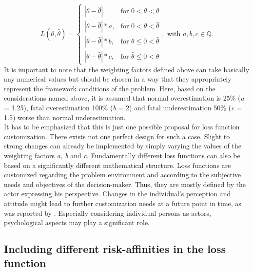 		\begin{equation}\label{eq:LF_final}
		L(\theta,\hat{\theta}) =
		\begin{cases}
		|\theta - \hat{\theta}|, & \text{for } 0<\hat{\theta}<\theta  \\
		|\theta-\hat{\theta}|*a, & \text{for } 0<\theta<\hat{\theta} \\
		|\theta-\hat{\theta}|*b, & \text{for } \theta\leq0<\hat{\theta} \\
		|\theta-\hat{\theta}|*c, & \text{for } \hat{\theta}\leq0<\theta 
		\end{cases},
		\text{ with } a,b,c \in \mathbb{Q}.
		\end{equation}  
		It is important to note that the weighting factors defined above can take basically any numerical values but should be chosen in a way that they appropriately represent the framework conditions of the problem. Here, based on the considerations named above, it is assumed that normal overestimation is 25\% (\textit{a} = 1.25), fatal overestimation 100\% (\textit{b} = 2) and fatal underestimation 50\% (\textit{c} = 1.5) worse than normal underestimation. \\		
		It has to be emphasized that this is just one possible proposal for loss function customization. There exists not one perfect design for such a case. Slight to strong changes can already be implemented by simply varying the values of the weighting factors \textit{a, b} and \textit{c}. Fundamentally different loss functions can also be based on a significantly different mathematical structure. Loss functions are customized regarding the problem environment and according to the subjective needs and objectives of the decision-maker. Thus, they are mostly defined by the actor expressing his perspective. Changes in the individual's perception and attitude might lead to further customization needs at a future point in time, as was reported by \citet{hennig2007}. Especially considering individual persons as actors, psychological aspects may play a significant role.
		
		\subsection{Including different risk-affinities in the loss function}
		
